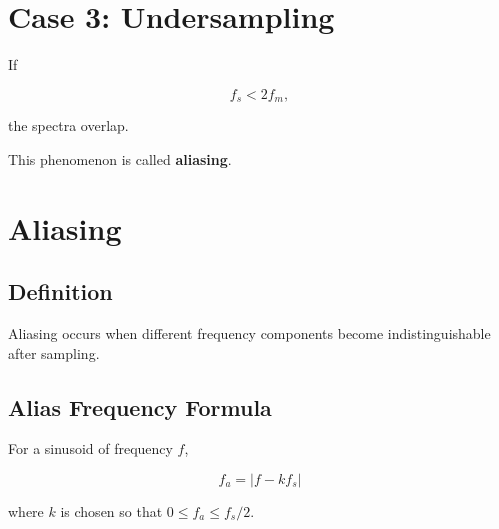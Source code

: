 
\section{Case 3: Undersampling}

If

\[
f_s<2f_m,
\]

the spectra overlap.

\begin{center}
\end{center}

This phenomenon is called \textbf{aliasing}.


\section{Aliasing}

\subsection{Definition}

Aliasing occurs when different frequency components become indistinguishable after
sampling.


\subsection{Alias Frequency Formula}

For a sinusoid of frequency \(f\),

\[
\boxed{
f_a=\left|f-kf_s\right|
}
\]

where \(k\) is chosen so that \(0\le f_a\le f_s/2\).


